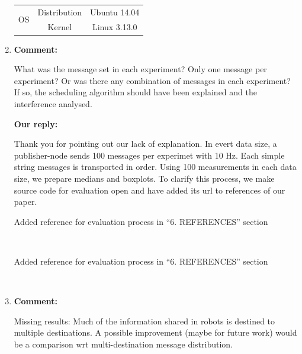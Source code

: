 \documentclass{article}
\begin{document}
\begin{enumerate}
\begin{table}[h]
\begin{threeparttable}
\begin{tabular}{c|c||c|c}
        \multirow{2}{*}{OS} & Distribution & \multicolumn{2}{c}{Ubuntu 14.04} \\ 
        & Kernel & \multicolumn{2}{c}{Linux 3.13.0} \\ \hline
      \end{tabular}
    \end{threeparttable}
  \end{table}
  
\item \begin{flushleft}
  \textbf{Comment:}
\end{flushleft}
  What was the message set in each experiment? Only one message per experiment? Or was there any combination of messages in each experiment? If so, the scheduling algorithm should have been explained and the interference analysed.
  
  \begin{flushleft}
    \textbf{Our reply:}
  \end{flushleft}
  Thank you for pointing out our lack of explanation.
  In evert data size, a publisher-node sends 100 messages per experimet with 10 Hz.
  Each simple string messages is transported in order.
  Using 100 measurements in each data size, we prepare medians and boxplots.
  To clarify this process, we make source code for evaluation open and have added its url to references of our paper.
  \begin{itembox}[|]{Added reference for evaluation process in ``6. REFERENCES'' section}
  \end{itembox}\\
  \begin{itembox}[|]{Added reference for evaluation process in ``6. REFERENCES'' section}
  \end{itembox}\\

\item \begin{flushleft}
  \textbf{Comment:}
\end{flushleft}
  Missing results: Much of the information shared in robots is destined to multiple destinations. A possible improvement (maybe for future work) would be a comparison wrt multi-destination message distribution.
  

\end{enumerate}
\end{document}
